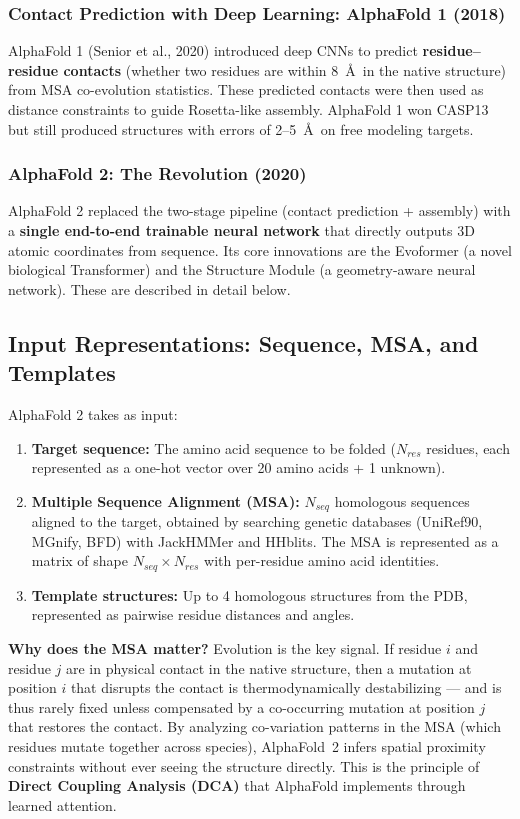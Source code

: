 ﻿\documentclass[12pt,a4paper]{article}
\begin{document}
\subsubsection{Contact Prediction with Deep Learning: AlphaFold 1 (2018)}
AlphaFold 1 (Senior et al., 2020) introduced deep CNNs to predict \textbf{residue--residue contacts} (whether two residues are within 8~\AA\ in the native structure) from MSA co-evolution statistics. These predicted contacts were then used as distance constraints to guide Rosetta-like assembly. AlphaFold 1 won CASP13 but still produced structures with errors of 2--5~\AA\ on free modeling targets.

\subsubsection{AlphaFold 2: The Revolution (2020)}
AlphaFold 2 replaced the two-stage pipeline (contact prediction + assembly) with a \textbf{single end-to-end trainable neural network} that directly outputs 3D atomic coordinates from sequence. Its core innovations are the Evoformer (a novel biological Transformer) and the Structure Module (a geometry-aware neural network). These are described in detail below.

\subsection{Input Representations: Sequence, MSA, and Templates}

AlphaFold 2 takes as input:
\begin{enumerate}[leftmargin=*, itemsep=4pt]
  \item \textbf{Target sequence:} The amino acid sequence to be folded ($N_{res}$ residues, each represented as a one-hot vector over 20 amino acids + 1 unknown).
  \item \textbf{Multiple Sequence Alignment (MSA):} $N_{seq}$ homologous sequences aligned to the target, obtained by searching genetic databases (UniRef90, MGnify, BFD) with JackHMMer and HHblits. The MSA is represented as a matrix of shape $N_{seq} \times N_{res}$ with per-residue amino acid identities.
  \item \textbf{Template structures:} Up to 4 homologous structures from the PDB, represented as pairwise residue distances and angles.
\end{enumerate}

\begin{comparebox}
\textbf{Why does the MSA matter?} Evolution is the key signal. If residue $i$ and residue $j$ are in physical contact in the native structure, then a mutation at position $i$ that disrupts the contact is thermodynamically destabilizing --- and is thus rarely fixed unless compensated by a co-occurring mutation at position $j$ that restores the contact. By analyzing co-variation patterns in the MSA (which residues mutate together across species), AlphaFold~2 infers spatial proximity constraints without ever seeing the structure directly. This is the principle of \textbf{Direct Coupling Analysis (DCA)} that AlphaFold implements through learned attention.
\end{comparebox}
\end{document}
